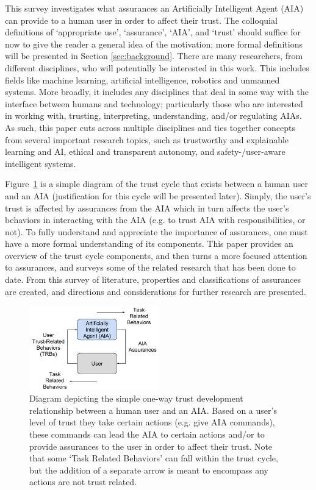 This survey investigates what assurances an Artificially Intelligent Agent (AIA) can provide to a human user in order to affect their trust. The colloquial definitions of `appropriate use', `assurance', `AIA', and `trust' should suffice for now to give the reader a general idea of the motivation; more formal definitions will be presented in Section \ref{sec:background}. There are many researchers, from different disciplines, who will potentially be interested in this work. This includes fields like machine learning, artificial intelligence, robotics and unmanned systems. More broadly, it includes any disciplines that deal in some way with the interface between humans and technology; particularly those who are interested in working with, trusting, interpreting, understanding, and/or regulating AIAs. As such, this paper cuts across multiple disciplines and ties together concepts from several important research topics, such as trustworthy and explainable learning and AI, ethical and transparent autonomy, and safety-/user-aware intelligent systems.

    Figure~\ref{fig:SimpleTrust_one_way} is a simple diagram of the trust cycle that exists between a human user and an AIA (justification for this cycle will be presented later). Simply, the user's trust is affected by assurances from the AIA which in turn affects the user's behaviors in interacting with the AIA (e.g. to trust AIA with responsibilities, or not). To fully understand and appreciate the importance of assurances, one must have a more formal understanding of its components. This paper provides an overview of the trust cycle components, and then turns a more focused attention to assurances, and surveys some of the related research that has been done to date. From this survey of literature, properties and classifications of assurances are created, and directions and considerations for further research are presented.

    \begin{figure}
        \centering
        \includegraphics[width=0.5\textwidth]{Figures/SimpleTrust_one_way}
        \caption{Diagram depicting the simple one-way trust development relationship between a human user and an AIA. Based on a user's level of trust they take certain actions (e.g. give AIA commands), these commands can lead the AIA to certain actions and/or to provide assurances to the user in order to affect their trust. Note that some `Task Related Behaviors' can fall within the trust cycle, but the addition of a separate arrow is meant to encompass any actions are not trust related.}
        \label{fig:SimpleTrust_one_way}
    \end{figure}

